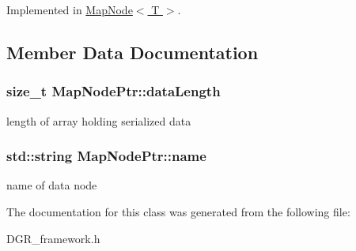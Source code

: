 Implemented in \hyperlink{classMapNode_a78cc24f37a1d1b4bda5075284ff53f92}{Map\+Node$<$ T $>$}.



\subsection{Member Data Documentation}
\hypertarget{classMapNodePtr_ac90162a897b772218843f49b4b08dc06}{
\subsubsection[{data\+Length}]{\setlength{\rightskip}{0pt plus 5cm}size\+\_\+t Map\+Node\+Ptr\+::data\+Length}}\label{classMapNodePtr_ac90162a897b772218843f49b4b08dc06}
length of array holding serialized data \hypertarget{classMapNodePtr_a928378e3e8b1661858463cedc8e721c9}{
\subsubsection[{name}]{\setlength{\rightskip}{0pt plus 5cm}std\+::string Map\+Node\+Ptr\+::name}}\label{classMapNodePtr_a928378e3e8b1661858463cedc8e721c9}
name of data node 

The documentation for this class was generated from the following file\+:\begin{DoxyCompactItemize}
\item 
D\+G\+R\+\_\+framework.\+h\end{DoxyCompactItemize}
